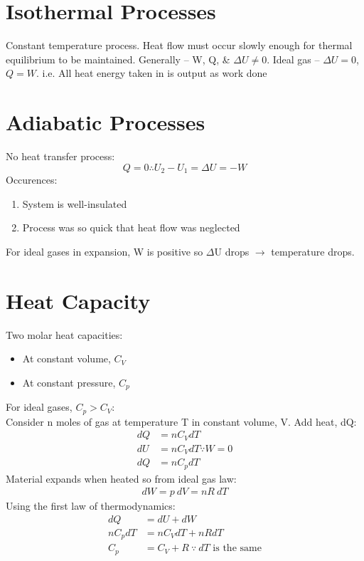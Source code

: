 \documentclass[a4paper, 11pt, normalem]{report}
\begin{document}
\section{Isothermal Processes}
Constant temperature process.
Heat flow must occur slowly enough for thermal equilibrium to be maintained.
Generally -- W, Q, \& ${\Delta}U \neq 0$.
Ideal gas -- ${\Delta}U = 0$, $Q = W$.
i.e. All heat energy taken in is output as work done

\section{Adiabatic Processes}
No heat transfer process:
\begin{equation}
	Q = 0 \therefore U_{2} - U_{1} = {\Delta}U = -W
\end{equation}
Occurences:
\begin{enumerate}
	\item System is well-insulated
	\item Process was so quick that heat flow was neglected
\end{enumerate}
For ideal gases in expansion, W is positive so $\Delta$U drops $\rightarrow$ temperature drops.

\section{Heat Capacity}
Two molar heat capacities:
\begin{itemize}
	\item At constant volume, $C_{V}$
	\item At constant pressure, $C_{p}$
\end{itemize}
For ideal gases, $C_{p} > C_{V}$:\\
Consider n moles of gas at temperature T in constant volume, V.
Add heat, dQ:
\begin{align}
    dQ &= nC_{V}dT \\
    dU &= nC_{V}dT \because W = 0 \\
    dQ &= nC_{p}dT
\end{align}
Material expands when heated so from ideal gas law:
\begin{align}
	dW = p\:dV = nR\:dT
\end{align}
Using the first law of thermodynamics:
\begin{align}
    dQ &= dU + dW \\
    nC_{p}dT &= nC_{V}dT + nRdT \\
    C_{p} &= C_{V} + R ~\because~ dT \text{ is the same}
\end{align}
\end{document}
